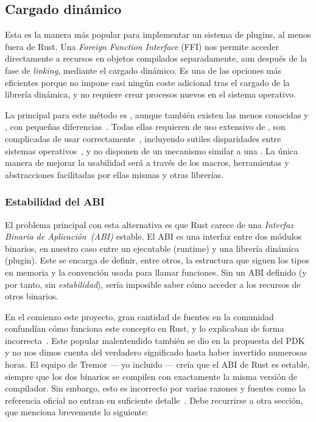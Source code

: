 \subsection{Cargado dinámico}\label{sec:dynload}

Esta es la manera más popular para implementar un sistema de plugins, al menos
fuera de Rust. Una \emph{Foreign Function Interface} (FFI) nos permite acceder
directamente a recursos en objetos compilados separadamente, aun después de la
fase de \emph{linking}, mediante el cargado dinámico. Es una de las opciones más
eficientes porque no impone casi ningún coste adicional tras el cargado de la
librería dinámica, y no requiere crear procesos nuevos en el sistema operativo.

La \crate principal para este método es , aunque también
existen las menos conocidas  y , con
pequeñas diferencias~\cite{cratesdynloadcompare}. Todas ellas requieren de uso
extensivo de \unsafe, son complicadas de usar
correctamente~\cite{hardplugins1}\cite{hardplugins2}, incluyendo sutiles
disparidades entre sistemas operativos~\cite{hardplugins3}, y no disponen de un
mecanismo similar a una \sandbox. La única manera de mejorar la usabilidad será
a través de los macros, herramientas y abstracciones facilitadas por ellas
mismas y otras librerías.

\subsubsection{Estabilidad del ABI}\label{sec:abi}

El problema principal con esta alternativa es que Rust carece de una
\emph{Interfaz Binaria de Aplicación~(ABI)} estable. El ABI es una interfaz
entre dos módulos binarios, en nuestro caso entre un ejecutable (runtime) y una
librería dinámica (plugin). Este se encarga de definir, entre otros, la
estructura que siguen los tipos en memoria y la convención usada para llamar
funciones. Sin un ABI definido (y por tanto, sin \emph{estabilidad}), sería
imposible saber cómo acceder a los recursos de otros binarios.

En el comienzo este proyecto, gran cantidad de fuentes en la comunidad
confundían cómo funciona este concepto en Rust, y lo explicaban de forma
incorrecta~\cite{wrongabi1}\cite{wrongabi2}\cite{wrongabi3}\cite{wrongabi4}.
Este popular malentendido también se dio en la propuesta del PDK y no nos dimos
cuenta del verdadero significado hasta haber invertido numerosas horas. El
equipo de Tremor --- yo incluido --- creía que el ABI de Rust es estable,
siempre que los dos binarios se compilen con exactamente la misma versión de
compilador. Sin embargo, esto es incorrecto por varias razones y fuentes como la
referencia oficial no entran en suficiente detalle~\cite[Application Binary
Interface (ABI)]{rustref}. Debe recurrirse a otra sección, que menciona
brevemente lo siguiente:

